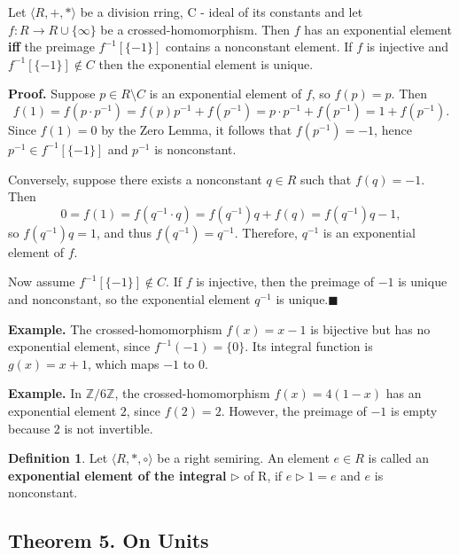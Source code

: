 \documentclass[12pt]{article}
\theoremstyle{definition}
\newtheorem{definition}{Definition}[section]
\begin{document}
Let $\langle R, +, * \rangle$ be a division rring, C - ideal of its constants and let $f: R \to R \cup \{\infty\}$ be a crossed-homomorphism. Then $f$ has an exponential element \textbf{iff} the preimage $f^{-1}[\{-1\}]$ contains a nonconstant element. If $f$ is injective and $f^{-1}[\{-1\}] \notin C$ then the exponential element is unique.

\vspace{10pt}
\noindent\textbf{Proof.}  
Suppose $p \in R \setminus C$ is an exponential element of $f$, so $f(p) = p$. Then  
\[
f(1) = f(p \cdot p^{-1}) = f(p)p^{-1} + f(p^{-1}) = p \cdot p^{-1} + f(p^{-1}) = 1 + f(p^{-1}).
\]
Since $f(1) = 0$ by the Zero Lemma, it follows that $f(p^{-1}) = -1$, hence $p^{-1} \in f^{-1}[\{-1\}]$ and $p^{-1}$ is nonconstant.

\vspace{5pt}
Conversely, suppose there exists a nonconstant $q \in R$ such that $f(q) = -1$.  Then  
\[
0 = f(1) = f(q^{-1} \cdot q) = f(q^{-1})q + f(q) = f(q^{-1})q - 1,
\] 
so $f(q^{-1})q = 1$, and thus $f(q^{-1}) = q^{-1}$. Therefore, $q^{-1}$ is an exponential element of $f$.

\vspace{5pt}
Now assume $f^{-1}[\{-1\}] \notin C$. If $f$ is injective, then the preimage of $-1$ is unique and nonconstant, so the exponential element $q^{-1}$ is unique.$\blacksquare$


\vspace{10pt}
\textbf{Example.} The crossed-homomorphism $f(x) = x - 1$ is bijective but has no exponential element, since $f^{-1}(-1) = \{0\}$. Its integral function is $g(x) = x + 1$, which maps $-1$ to $0$.

\vspace{10pt}
\textbf{Example.} In $\mathbb{Z}/6\mathbb{Z}$, the crossed-homomorphism $f(x) = 4(1 - x)$ has an exponential element $2$, since $f(2) = 2$. However, the preimage of $-1$ is empty because $2$ is not invertible.

\vspace{10pt}

\begin{definition} Let $\langle R, *, \circ \rangle$ be a right semiring. An element $e \in R$ is called an \textbf{exponential element of the integral} $\triangleright$ of R, if $e \triangleright 1 = e$ and $e$ is nonconstant.
\end{definition}

\subsection{Theorem 5. On Units}  
\end{document}
